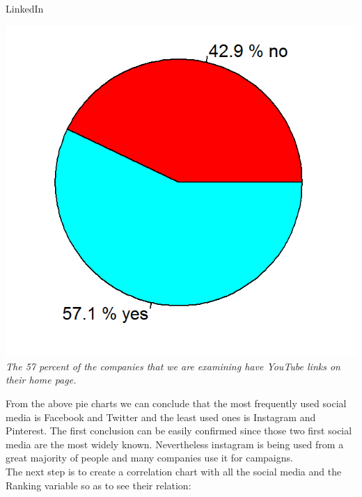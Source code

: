 \documentclass{article}
\begin{document}
\begin{table}[H]
\centering
\caption{LinkedIn}
\begin{center}
\includegraphics[scale=0.6]{../R/photos/20_linkedin_dist.png}  \\
\textit{The 57 percent of the companies that we are examining have YouTube links on their home page.}
\end{center}
\end{table}
From the above pie charts we can conclude that the most frequently used social media is Facebook and Twitter and the least used ones is Instagram and Pinterest. The first conclusion can be easily confirmed since those two first social media are the most widely known. Nevertheless instagram is being used from a great majority of people and many companies use it for campaigns.\\
The next step is to create a correlation chart with all the social media and the Ranking variable so as to see their relation:
\end{document}
